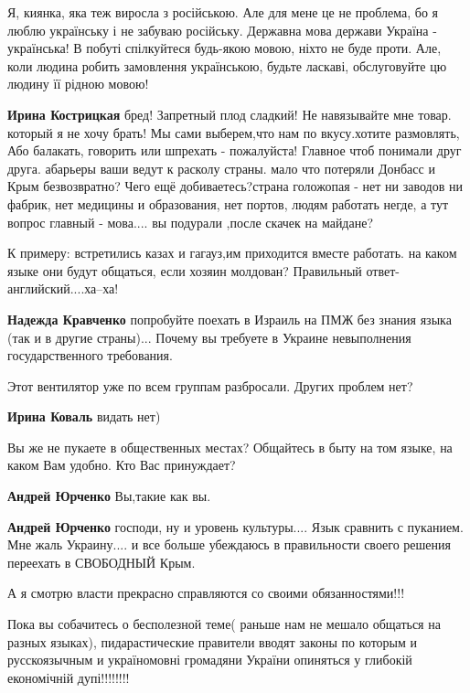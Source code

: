 \begin{itemize}

Я, киянка, яка теж виросла з російською. Але для мене це не проблема, бо я
люблю українську і не забуваю російську. Державна мова держави Україна -
українська! В побуті спілкуйтеся будь-якою мовою, ніхто не буде проти. Але,
коли людина робить замовлення українською, будьте ласкаві, обслуговуйте цю
людину її рідною мовою!

\begin{itemize}
\textbf{Ирина Кострицкая} бред! Запретный плод сладкий! Не навязывайте мне
товар. который я не хочу брать! Мы сами выберем,что нам по вкусу.хотите
размовлять, Або балакать, говорить или шпрехать - пожалуйста! Главное чтоб
понимали друг друга. абарьеры ваши ведут к расколу страны. мало что потеряли
Донбасс и Крым безвозвратно? Чего ещё добиваетесь?страна голожопая - нет ни
заводов ни фабрик, нет медицины и образования, нет портов, людям работать негде, а
тут вопрос главный - мова.... вы подурали ,после скачек на майдане?

К примеру: встретились казах и гагауз,им приходится вместе работать. на каком
языке они будут общаться, если хозяин молдован? Правильный ответ-
английский....ха--ха!

\textbf{Надежда Кравченко} попробуйте поехать в Израиль на ПМЖ без знания языка
(так и в другие страны)... Почему вы требуете в Украине невыполнения
государственного требования.
\end{itemize}

Этот вентилятор уже по всем группам разбросали. Других проблем нет?

\textbf{Ирина Коваль} видать нет)

Вы же не пукаете в общественных местах? Общайтесь в быту на том языке, на каком Вам удобно. Кто Вас принуждает?

\textbf{Андрей Юрченко} Вы,такие как вы.

\textbf{Андрей Юрченко} господи, ну и уровень культуры.... Язык сравнить с
пуканием. Мне жаль Украину.... и все больше убеждаюсь в правильности своего
решения переехать в СВОБОДНЫЙ Крым.


А я смотрю власти прекрасно справляются со своими обязанностями!!!

Пока вы собачитесь о бесполезной теме( раньше нам не мешало общаться на разных
языках), пидарастические правители вводят законы по которым и русскоязычным и
україномовні громадяни України опиняться у глибокій економічній дупі!!!!!!!!


\end{itemize}
